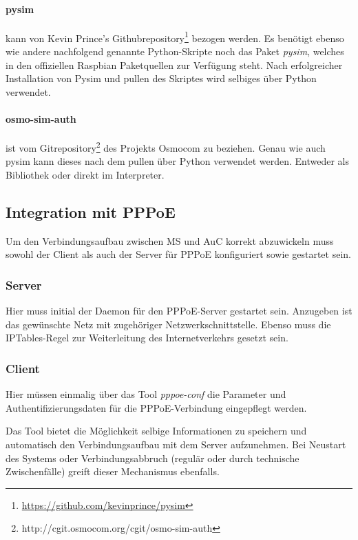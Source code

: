 			\paragraph{pysim} kann von Kevin Prince's Githubrepository\footnote{\url{https://github.com/kevinprince/pysim}} bezogen werden. Es benötigt ebenso
            wie andere nachfolgend genannte Python-Skripte noch das Paket \textit{pysim}, welches
            in den offiziellen Raspbian Paketquellen zur Verfügung steht. Nach erfolgreicher Installation
            von Pysim und pullen des Skriptes wird selbiges über Python verwendet.

            \paragraph{osmo-sim-auth} ist vom Gitrepository\footnote{\url{}http://cgit.osmocom.org/cgit/osmo-sim-auth} des Projekts Osmocom zu  beziehen. Genau wie auch pysim kann dieses nach dem pullen
            über Python verwendet werden. Entweder als Bibliothek oder direkt im Interpreter.

	\subsection{Integration mit PPPoE}
        Um den Verbindungsaufbau zwischen \ac{MS} und \ac{AuC} korrekt abzuwickeln muss sowohl der Client
        als auch der Server für \ac{PPPoE} konfiguriert sowie gestartet sein.

		 \subsubsection{Server}
         Hier muss initial der Daemon für den \ac{PPPoE}-Server gestartet sein. Anzugeben ist das gewünschte
         Netz mit zugehöriger Netzwerkschnittstelle. Ebenso muss die IPTables-Regel zur Weiterleitung
         des Internetverkehrs gesetzt sein.

         \subsubsection{Client}
         Hier müssen einmalig über das Tool \textit{pppoe-conf} die Parameter und Authentifizierungsdaten
         für die \ac{PPPoE}-Verbindung eingepflegt werden.

         Das Tool bietet die Möglichkeit selbige Informationen
         zu speichern und automatisch den Verbindungsaufbau mit dem Server aufzunehmen. Bei Neustart
         des Systems oder Verbindungsabbruch (regulär oder durch technische Zwischenfälle) greift dieser
         Mechanismus ebenfalls.

\clearpage
